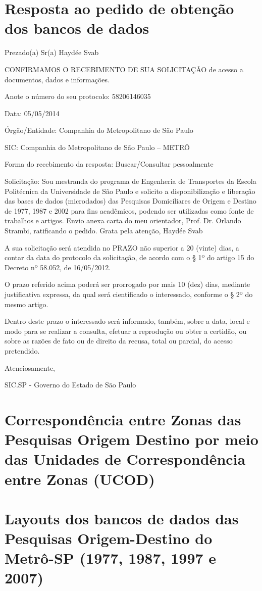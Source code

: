 \chapter{Resposta ao pedido de obtenção dos bancos de dados}\label{chap:esic}

Prezado(a) Sr(a) Haydée Svab

CONFIRMAMOS O RECEBIMENTO DE SUA SOLICITAÇÃO de acesso a documentos, dados e informações.

Anote o número do seu protocolo: 58206146035

Data: 05/05/2014

Órgão/Entidade:  Companhia do Metropolitano de São Paulo

SIC:  Companhia do Metropolitano de São Paulo – METRÔ

Forma do recebimento da resposta: Buscar/Consultar pessoalmente

Solicitação:
Sou mestranda do programa de Engenheria de Transportes da Escola Politécnica da Universidade de São Paulo e solicito a disponibilização e liberação das bases de dados (microdados) das Pesquisas Domiciliares de Origem e Destino de 1977, 1987 e 2002 para fins acadêmicos, podendo ser utilizadas como fonte de trabalhos e artigos.
Envio anexa carta do meu orientador, Prof. Dr. Orlando Strambi, ratificando o pedido.
Grata pela atenção,
Haydée Svab

A sua solicitação será atendida no PRAZO não superior a 20 (vinte) dias, a contar da data do protocolo da solicitação, de acordo com o § 1º do artigo 15 do Decreto nº 58.052, de 16/05/2012.

O prazo referido acima poderá ser prorrogado por mais 10 (dez) dias, mediante justificativa expressa, da qual será cientificado o interessado, conforme o § 2º do mesmo artigo.

Dentro deste prazo o interessado será informado, também, sobre a data, local e modo para se realizar a consulta, efetuar a reprodução ou obter a certidão, ou sobre as razões de fato ou de direito da recusa, total ou parcial, do acesso pretendido.

Atenciosamente,

SIC.SP - Governo do Estado de São Paulo 
\chapter{Correspondência entre Zonas das Pesquisas Origem Destino por meio das Unidades de Correspondência entre Zonas (UCOD)}\label{chap:anexo_ucod}



\chapter{Layouts dos bancos de dados das Pesquisas Origem-Destino do Metrô-SP (1977, 1987, 1997 e 2007)}\label{chap:anexo_layouts}




%


